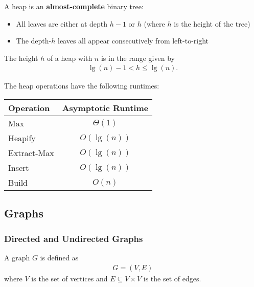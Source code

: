 \documentclass{article}
\begin{document}
\begin{definition}
	A heap is an \textbf{almost-complete} binary tree:
	\begin{itemize}
		\item All leaves are either at depth $h-1$ or $h$ (where $h$ is the height of the tree)
		\item The depth-$h$ leaves all appear consecutively from left-to-right
	\end{itemize}
\end{definition}
\begin{lemma}
	The height $h$ of a heap with $n$ is in the range given by
	\begin{align*}
		\lg(n)-1 < h \leq \lg(n).
	\end{align*}
\end{lemma}
\begin{theorem}
	The heap operations have the following runtimes:
	\\
	\begin{center}
	\begin{tabular}{| l | c |}
		\hline
		Operation & Asymptotic Runtime\\
		\hline
		Max & $\Theta(1)$\\
		\hline
		Heapify & $O(\lg(n))$\\
		\hline
		Extract-Max & $O(\lg(n))$\\
		\hline
		Insert & $O(\lg(n))$\\
		\hline
		Build & $O(n)$\\
		\hline
	\end{tabular}
	\end{center}
\end{theorem}


\subsection{Graphs}


\subsubsection{Directed and Undirected Graphs}

\begin{definition}
	A graph $G$ is defined as
	\begin{align*}
		G = (V,E)
	\end{align*}
	where $V$ is the set of vertices and $E\subseteq V\times V$ is the set of edges.
\end{definition}
\end{document}
